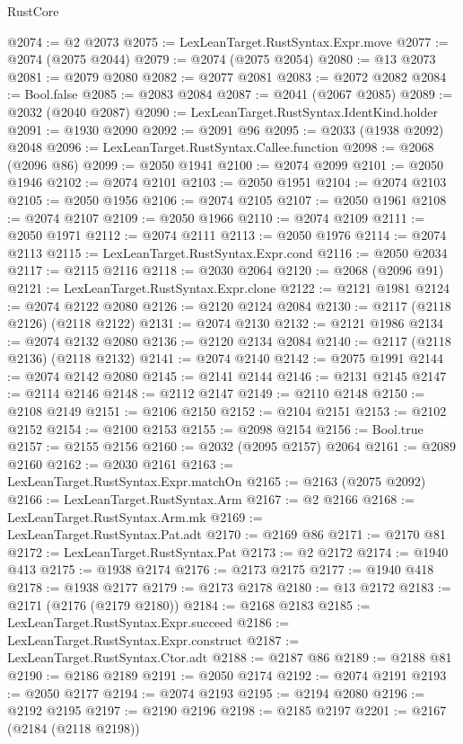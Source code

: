 \begin{lexlean}{RustCore}
\begin{coremodule}
@2074 := @2 @2073
@2075 := LexLeanTarget.RustSyntax.Expr.move
@2077 := @2074 (@2075 @2044)
@2079 := @2074 (@2075 @2054)
@2080 := @13 @2073
@2081 := @2079 @2080
@2082 := @2077 @2081
@2083 := @2072 @2082
@2084 := Bool.false
@2085 := @2083 @2084
@2087 := @2041 (@2067 @2085)
@2089 := @2032 (@2040 @2087)
@2090 := LexLeanTarget.RustSyntax.IdentKind.holder
@2091 := @1930 @2090
@2092 := @2091 @96
@2095 := @2033 (@1938 @2092) @2048
@2096 := LexLeanTarget.RustSyntax.Callee.function
@2098 := @2068 (@2096 @86)
@2099 := @2050 @1941
@2100 := @2074 @2099
@2101 := @2050 @1946
@2102 := @2074 @2101
@2103 := @2050 @1951
@2104 := @2074 @2103
@2105 := @2050 @1956
@2106 := @2074 @2105
@2107 := @2050 @1961
@2108 := @2074 @2107
@2109 := @2050 @1966
@2110 := @2074 @2109
@2111 := @2050 @1971
@2112 := @2074 @2111
@2113 := @2050 @1976
@2114 := @2074 @2113
@2115 := LexLeanTarget.RustSyntax.Expr.cond
@2116 := @2050 @2034
@2117 := @2115 @2116
@2118 := @2030 @2064
@2120 := @2068 (@2096 @91)
@2121 := LexLeanTarget.RustSyntax.Expr.clone
@2122 := @2121 @1981
@2124 := @2074 @2122 @2080
@2126 := @2120 @2124 @2084
@2130 := @2117 (@2118 @2126) (@2118 @2122)
@2131 := @2074 @2130
@2132 := @2121 @1986
@2134 := @2074 @2132 @2080
@2136 := @2120 @2134 @2084
@2140 := @2117 (@2118 @2136) (@2118 @2132)
@2141 := @2074 @2140
@2142 := @2075 @1991
@2144 := @2074 @2142 @2080
@2145 := @2141 @2144
@2146 := @2131 @2145
@2147 := @2114 @2146
@2148 := @2112 @2147
@2149 := @2110 @2148
@2150 := @2108 @2149
@2151 := @2106 @2150
@2152 := @2104 @2151
@2153 := @2102 @2152
@2154 := @2100 @2153
@2155 := @2098 @2154
@2156 := Bool.true
@2157 := @2155 @2156
@2160 := @2032 (@2095 @2157) @2064
@2161 := @2089 @2160
@2162 := @2030 @2161
@2163 := LexLeanTarget.RustSyntax.Expr.matchOn
@2165 := @2163 (@2075 @2092)
@2166 := LexLeanTarget.RustSyntax.Arm
@2167 := @2 @2166
@2168 := LexLeanTarget.RustSyntax.Arm.mk
@2169 := LexLeanTarget.RustSyntax.Pat.adt
@2170 := @2169 @86
@2171 := @2170 @81
@2172 := LexLeanTarget.RustSyntax.Pat
@2173 := @2 @2172
@2174 := @1940 @413
@2175 := @1938 @2174
@2176 := @2173 @2175
@2177 := @1940 @418
@2178 := @1938 @2177
@2179 := @2173 @2178
@2180 := @13 @2172
@2183 := @2171 (@2176 (@2179 @2180))
@2184 := @2168 @2183
@2185 := LexLeanTarget.RustSyntax.Expr.succeed
@2186 := LexLeanTarget.RustSyntax.Expr.construct
@2187 := LexLeanTarget.RustSyntax.Ctor.adt
@2188 := @2187 @86
@2189 := @2188 @81
@2190 := @2186 @2189
@2191 := @2050 @2174
@2192 := @2074 @2191
@2193 := @2050 @2177
@2194 := @2074 @2193
@2195 := @2194 @2080
@2196 := @2192 @2195
@2197 := @2190 @2196
@2198 := @2185 @2197
@2201 := @2167 (@2184 (@2118 @2198))

\end{coremodule}
\end{lexlean}
